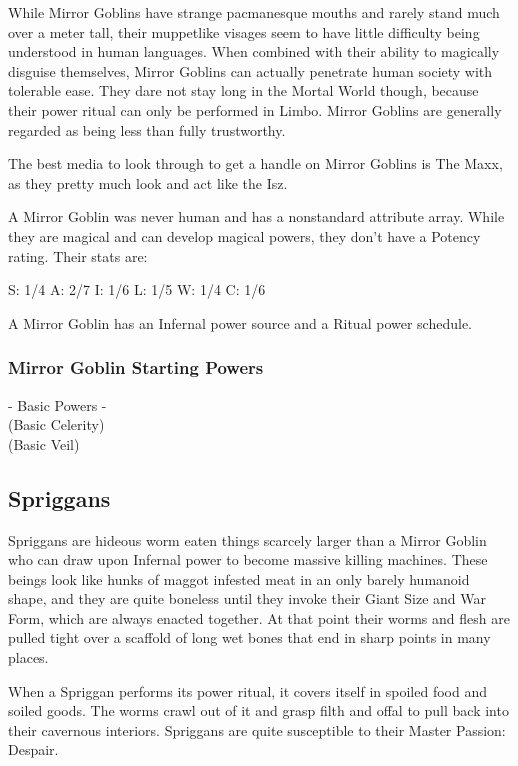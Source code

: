 While Mirror Goblins have strange pacmanesque mouths and rarely stand much over a meter tall, their muppetlike visages seem to have little difficulty being understood in human languages. When combined with their ability to magically disguise themselves, Mirror Goblins can actually penetrate human society with tolerable ease. They dare not stay long in the Mortal World though, because their power ritual can only be performed in Limbo. Mirror Goblins are generally regarded as being less than fully trustworthy.

The best media to look through to get a handle on Mirror Goblins is The Maxx, as they pretty much look and act like the Isz.

A Mirror Goblin was never human and has a nonstandard attribute array. While they are magical and can develop magical powers, they don't have a Potency rating. Their stats are:

S: 1/4 A: 2/7 I: 1/6 L: 1/5 W: 1/4 C: 1/6

A Mirror Goblin has an Infernal power source and a Ritual power schedule.

\subsubsection{Mirror Goblin Starting Powers}

\hspace{\parindent} - Basic Powers -\\
 (Basic Celerity)\\
 (Basic Veil)

\subsection{Spriggans} 

Spriggans are hideous worm eaten things scarcely larger than a Mirror Goblin who can draw upon Infernal power to become massive killing machines. These beings look like hunks of maggot infested meat in an only barely humanoid shape, and they are quite boneless until they invoke their Giant Size and War Form, which are always enacted together. At that point their worms and flesh are pulled tight over a scaffold of long wet bones that end in sharp points in many places.

When a Spriggan performs its power ritual, it covers itself in spoiled food and soiled goods. The worms crawl out of it and grasp filth and offal to pull back into their cavernous interiors. Spriggans are quite susceptible to their Master Passion: Despair.

